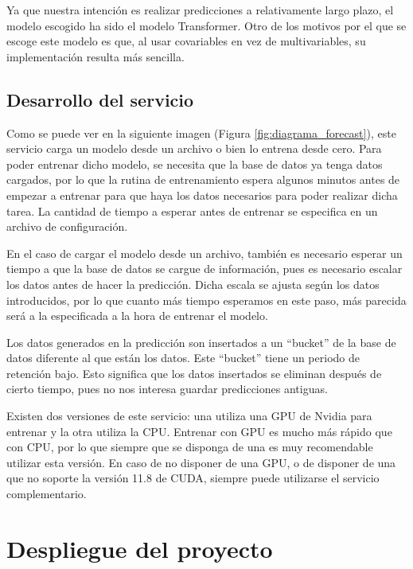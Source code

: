 Ya que nuestra intención es realizar predicciones a relativamente largo plazo, el modelo escogido ha sido el modelo 
Transformer. Otro de los motivos por el que se escoge este modelo es que, al usar covariables en vez de multivariables,
su implementación resulta más sencilla.

\subsection{Desarrollo del servicio}

Como se puede ver en la siguiente imagen (Figura \ref{fig:diagrama_forecast}), este servicio carga un modelo desde 
un archivo o bien lo entrena desde cero. Para poder entrenar dicho modelo, se necesita que la base de datos ya tenga 
datos cargados, por lo que la rutina de entrenamiento espera algunos minutos antes de empezar a entrenar para que 
haya los datos necesarios para poder realizar dicha tarea. La cantidad de tiempo a esperar antes de entrenar se especifica 
en un archivo de configuración.

En el caso de cargar el modelo desde un archivo, también es necesario esperar un tiempo a que la base de datos se cargue 
de información, pues es necesario escalar los datos antes de hacer la predicción. Dicha escala se ajusta según los datos 
introducidos, por lo que cuanto más tiempo esperamos en este paso, más parecida será a la especificada a la hora
de entrenar el modelo.

Los datos generados en la predicción son insertados a un ``bucket'' de la base de datos diferente al que están los datos.
Este ``bucket'' tiene un periodo de retención bajo. Esto significa que los datos insertados se eliminan después 
de cierto tiempo, pues no nos interesa guardar predicciones antiguas.

Existen dos versiones de este servicio: una utiliza una GPU de Nvidia para entrenar y la otra utiliza la CPU. Entrenar con
GPU es mucho más rápido que con CPU, por lo que siempre que se disponga de una es muy recomendable utilizar esta versión.
En caso de no disponer de una GPU, o de disponer de una que no soporte la versión 11.8 de CUDA, siempre puede utilizarse el 
servicio complementario.


\section{Despliegue del proyecto}

